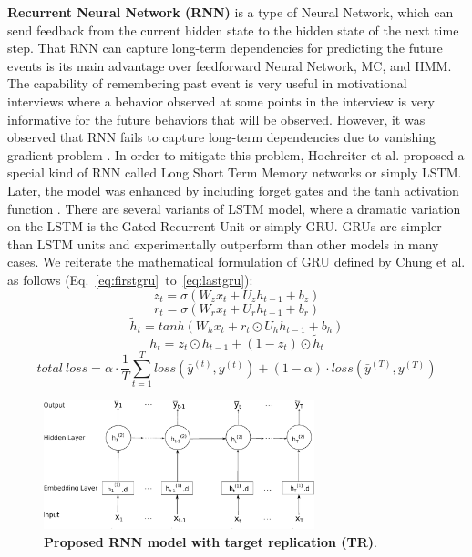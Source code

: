 \documentclass{amia_summit_2018}
\begin{document}
\textbf {Recurrent Neural Network (RNN)} is a type of Neural Network, which can send feedback from the current hidden state to the hidden state of the next time step. That RNN can capture long-term dependencies for predicting the future events is its main advantage over feedforward Neural Network, MC, and HMM. The capability of remembering past event is very useful in motivational interviews where a behavior observed at some points in the interview is very informative for the future behaviors that will be observed. However, it was observed that RNN fails to capture long-term dependencies due to vanishing gradient problem \cite{bengio1993problem}. In order to mitigate this problem, Hochreiter et al.\cite{hochreiter1997long} proposed a special kind of RNN called Long Short Term Memory networks or simply LSTM. Later, the model was enhanced by including forget gates and the tanh activation function \cite{graves2013speech}. There are several variants of LSTM model, where a dramatic variation on the LSTM is the Gated Recurrent Unit\cite{cho2014properties} or simply GRU. GRUs are simpler than LSTM units and experimentally outperform than other models in many cases. We reiterate the mathematical formulation of GRU defined by Chung et al.\cite{chung2014empirical} as follows (Eq.~\ref{eq:firstgru}~to~\ref{eq:lastgru}):
\begin{equation}
z_t = \sigma(W_zx_t + U_zh_{t-1} + b_z)
\label{eq:firstgru}
\end{equation}
\begin{equation}
r_t = \sigma(W_rx_t + U_rh_{t-1} + b_r)
\end{equation}
\begin{equation}
\tilde h_t = tanh(W_hx_t + r_t \odot U_hh_{t-1} + b_h) 
\end{equation}
\begin{equation}
h_t = z_t \odot h_{t-1} + (1-z_t) \odot \tilde h_t
\label{eq:lastgru}
\end{equation}  
\begin{equation}
total\ loss = \alpha \cdot \frac{1}{T}\sum_{t=1}^T loss(\bar y^{(t)},y^{(t)}) + (1 - \alpha) \cdot loss(\bar y^{(T)},y^{(T)})
\label{eq:loss}
\end{equation}  
\begin{figure}[!htb]
    \centering
    \includegraphics[width=0.70\textwidth]{figures/rnn_small.eps}
    \caption{\textbf{Proposed RNN model with target replication (TR)}.}
    \label{fig:rnn-model}
\end{figure}
\end{document}
